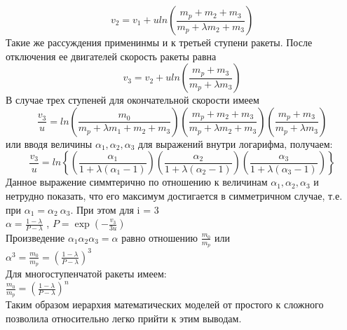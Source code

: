 \documentclass[12pt,a4paper]{article}
\begin{document}
	\begin{equation*}
	v_2 = v_1 + u ln\left( \frac{m_p + m_2 + m_3}{m_p + \lambda m_2 + m_3}\right)
	\end{equation*}
	Такие же рассуждения применинмы и к третьей ступени ракеты. После отключения ее двигателей скорость ракеты равна \\
	\begin{equation*}
	v_3 = v_2 + u ln\left(\frac{m_p + m_3}{m_p + \lambda m_3} \right)
	\end{equation*}
	В случае трех ступеней для окончательной скорости имеем\\
	\begin{equation*}
	\frac{v_3}{u} = ln\left(\frac{m_0}{m_p + \lambda m_1 + m_2 + m_3}\right)\left( \frac{m_p + m_2 + m_3}{m_p + \lambda m_2 + m_3}\right)\left(\frac{m_p + m_3}{m_p + \lambda m_3}\right)
	\end{equation*}
	или вводя величины $\alpha_1, \alpha_2, \alpha_3$ для выражений внутри логарифма, получаем:\\
	\begin{equation*}
	\frac{v_3}{u} = ln\left\{ \left(\frac{\alpha_1}{1+\lambda(\alpha_1-1)}\right)\left(\frac{\alpha_2}{1+\lambda(\alpha_2-1)}\right)\left(\frac{\alpha_3}{1+\lambda(\alpha_3-1)}\right)\right\}
	\end{equation*}
	Данное выражение симмтерично по отношению к величинам $\alpha_1, \alpha_2, \alpha_3$ и нетрудно показать, что его максимум достигается в симметричном случае, т.е. при $\alpha_1 = \alpha_2 \ \alpha_3$. При этом для i = 3\\
	$\alpha = \displaystyle\frac{1-\lambda}{P - \lambda}$ , $P = \exp\left(-\displaystyle\frac{v_3}{3u}\right)$\\
	Произведение $\alpha_1\alpha_2\alpha_3 = \alpha$ равно отношению $\frac{m_0}{m_p}$ или \\
	$\alpha^3 = \displaystyle\frac{m_0}{m_p} = \left(\displaystyle\frac{1-\lambda}{P - \lambda}\right)^3$\\
	Для многоступенчатой ракеты имеем:\\
	$\displaystyle\frac{m_0}{m_p} = \left(\displaystyle\frac{1-\lambda}{P - \lambda}\right)^n$\\
	Таким образом иерархия математических моделей от простого к сложного позволила относительно легко прийти к этим выводам. 
\end{document}
